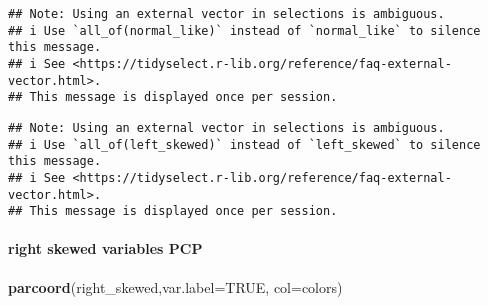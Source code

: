 \documentclass[]{article}
\newenvironment{Shaded}{\begin{snugshade}}{\end{snugshade}}
\newcommand{\CommentTok}[1]{\textcolor[rgb]{0.56,0.35,0.01}{\textit{#1}}}
\newcommand{\DataTypeTok}[1]{\textcolor[rgb]{0.13,0.29,0.53}{#1}}
\newcommand{\KeywordTok}[1]{\textcolor[rgb]{0.13,0.29,0.53}{\textbf{#1}}}
\newcommand{\NormalTok}[1]{#1}
\newcommand{\OperatorTok}[1]{\textcolor[rgb]{0.81,0.36,0.00}{\textbf{#1}}}
\newcommand{\OtherTok}[1]{\textcolor[rgb]{0.56,0.35,0.01}{#1}}
\newcommand{\StringTok}[1]{\textcolor[rgb]{0.31,0.60,0.02}{#1}}
\let\oldparagraph\paragraph
\renewcommand{\paragraph}[1]{\oldparagraph{#1}\mbox{}}
\begin{document}
\begin{Shaded}
\end{Shaded}

\begin{verbatim}
## Note: Using an external vector in selections is ambiguous.
## i Use `all_of(normal_like)` instead of `normal_like` to silence this message.
## i See <https://tidyselect.r-lib.org/reference/faq-external-vector.html>.
## This message is displayed once per session.
\end{verbatim}

\begin{Shaded}
\end{Shaded}

\begin{verbatim}
## Note: Using an external vector in selections is ambiguous.
## i Use `all_of(left_skewed)` instead of `left_skewed` to silence this message.
## i See <https://tidyselect.r-lib.org/reference/faq-external-vector.html>.
## This message is displayed once per session.
\end{verbatim}

\hypertarget{right-skewed-variables-pcp}{%
\paragraph{right skewed variables
PCP}\label{right-skewed-variables-pcp}}

\begin{Shaded}
\begin{Highlighting}[]
\KeywordTok{parcoord}\NormalTok{(right_skewed,}\DataTypeTok{var.label=}\OtherTok{TRUE}\NormalTok{, }\DataTypeTok{col=}\NormalTok{colors)}
\end{Highlighting}
\end{Shaded}
\end{document}
